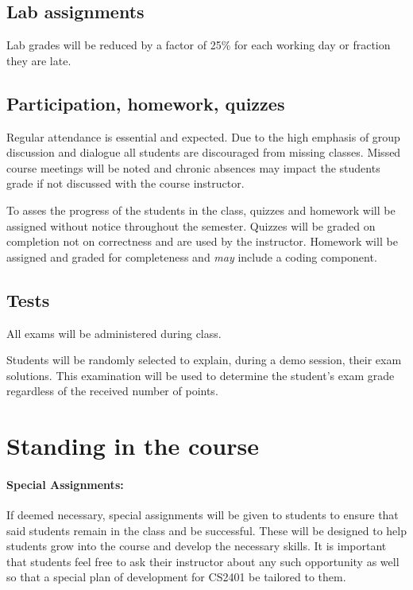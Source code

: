 \documentclass[12pt]{scrartcl}
\begin{document}
\subsection{Lab assignments}

Lab grades will be reduced by a factor of 25\% for each working day or fraction they are late.



\subsection{Participation, homework, quizzes}

Regular attendance is essential and expected. 
Due to the high emphasis of group discussion and dialogue all students are discouraged from missing classes. 
Missed course meetings will be noted and chronic absences may impact the students grade if not discussed with the course instructor.

To asses the progress of the students in the class, quizzes and homework will be assigned without notice throughout the semester. 
Quizzes will be graded on completion not on correctness and are used by the instructor. 
Homework will be assigned and graded for completeness and \emph{may} include a coding component. 

\subsection{Tests}

All exams will be administered during class. 

Students will be randomly selected to explain, during a demo session, their exam solutions. 
This examination will be used to determine the student’s exam grade regardless of the received number of points.
 

\section{Standing in the course}

\paragraph{Special Assignments:} 
If deemed necessary, special assignments will be given to students to ensure that said students remain in the class and be successful. 
These will be designed to help students grow into the course and develop the necessary skills.
It is important that students feel free to ask their instructor about any such opportunity as well so that a special plan of development for CS2401 be tailored to them.
\end{document}
